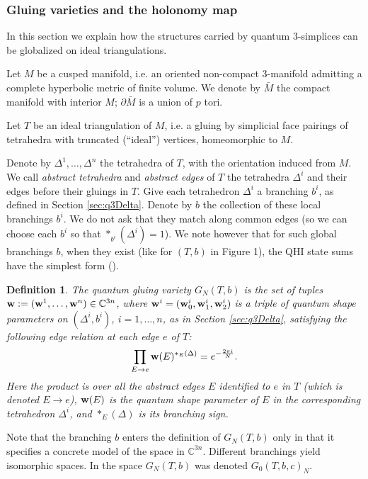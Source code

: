 \documentclass[11pt]{amsart}
\newtheorem{defi}[teo]{Definition}
\newcommand{\mc}{\mathbb{C}}
\newcommand{\bw}{{\bf w}}
\newcommand{\ra}{\rightarrow}
\begin{document}
\subsubsection{Gluing varieties and the holonomy map}\label{sec:tri_GV} In this section we explain how the structures carried by quantum $3$-simplices can be globalized on ideal triangulations.
\smallskip

Let $M$ be a cusped manifold, i.e. an oriented non-compact $3$-manifold admitting a complete hyperbolic metric of finite volume. We denote by $\bar{M}$ the compact manifold with interior $M$; $\partial \bar{M}$ is a union of $p$ tori. 

Let  $T$ be an ideal triangulation of $M$, i.e. a gluing by simplicial face pairings of tetrahedra with truncated (``ideal'') vertices, homeomorphic to $M$. 

Denote by $\Delta^1,\ldots,\Delta^n$ the tetrahedra of $T$, with the orientation induced from $M$. We call {\it abstract tetrahedra} and {\it abstract edges} of $T$ the tetrahedra $\Delta^i$ and their edges before their gluings in $T$. Give each tetrahedron $\Delta^i$ a branching $b^i$, as defined in Section \ref{sec:q3Delta}. Denote by $b$ the collection of these local branchings $b^i$. We do not ask that they match along common edges (so we can choose each $b^i$ so that $*_{b^i}(\Delta^i)=1$). We note however that for such global branchings $b$, when they exist (like for $(T,b)$ in Figure 1), the QHI state sums have the simplest form (\cite{AGT}).
\smallskip

\begin{defi} {\rm The {\it quantum gluing variety} $G_N(T,b)$ is the set of tuples $\bw:=(\bw^1,\ldots,\bw^n)\in \mc^{3n}$, where $\bw^i=(\bw_0^i,\bw_1^i,\bw_2^i)$ is a triple of quantum shape parameters on $(\Delta^i,b^i)$, $i=1,\ldots,n$, as in Section \ref{sec:q3Delta}, satisfying the following {\it edge relation} at each edge $e$ of $T$:}
\begin{equation}\label{edgerel}
\prod_{E\ra e} \bw(E)^{*_E(\Delta)} =  e^{-\frac{2\pi i}{N}}.
\end{equation}
{\rm Here the product is over all the abstract edges $E$ identified to $e$ in $T$ (which is denoted $E\ra e$), $\bw(E)$ is the quantum shape parameter of $E$ in the corresponding  tetrahedron $\Delta^i$, and $*_E(\Delta)$ is its branching sign.}
\end{defi}
Note that the branching $b$ enters the definition of $G_N(T,b)$ only in that it specifies a concrete model of the space in $\mc^{3n}$. Different branchings yield isomorphic spaces. In \cite[Section 3B and 4C]{AGT} the space $G_N(T,b)$ was denoted $G_0(T,b,c)_N$. 
\smallskip
\end{document}
